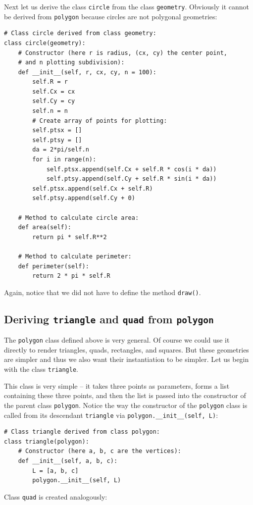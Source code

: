 Next let us derive the class {\tt circle} from the class {\tt geometry}. Obviously it cannot be derived
from {\tt polygon} because circles are not polygonal geometries:

\begin{verbatim}
# Class circle derived from class geometry:
class circle(geometry):
    # Constructor (here r is radius, (cx, cy) the center point,
    # and n plotting subdivision):
    def __init__(self, r, cx, cy, n = 100):
        self.R = r
        self.Cx = cx
        self.Cy = cy
        self.n = n
        # Create array of points for plotting:
        self.ptsx = []
        self.ptsy = []
        da = 2*pi/self.n
        for i in range(n):
            self.ptsx.append(self.Cx + self.R * cos(i * da))
            self.ptsy.append(self.Cy + self.R * sin(i * da))
        self.ptsx.append(self.Cx + self.R)
        self.ptsy.append(self.Cy + 0)
            
    # Method to calculate circle area:
    def area(self):
        return pi * self.R**2
      
    # Method to calculate perimeter:
    def perimeter(self):
        return 2 * pi * self.R
\end{verbatim}
Again, notice that we did not have to define the method {\tt draw()}.

\subsection{Deriving {\tt triangle} and {\tt quad} from {\tt polygon}}

The {\tt polygon} class defined above is very general. Of course we could use 
it directly to render triangles, quads, rectangles, and squares. But these 
geometries are simpler and thus we also want their instantiation to be simpler.  
Let us begin with the class {\tt triangle}. 

This class is very simple -- it takes three points as parameters, forms 
a list containing these three points, and then the list is passed into the 
constructor of the parent class {\tt polygon}. Notice the way the constructor of
the {\tt polygon} class is called from its descendant {\tt triangle} via 
{\tt polygon.\_\_init\_\_(self, L)}:

\begin{verbatim}
# Class triangle derived from class polygon:
class triangle(polygon):
    # Constructor (here a, b, c are the vertices):
    def __init__(self, a, b, c):
        L = [a, b, c]
        polygon.__init__(self, L)
\end{verbatim}
Class {\tt quad} is created analogously:

